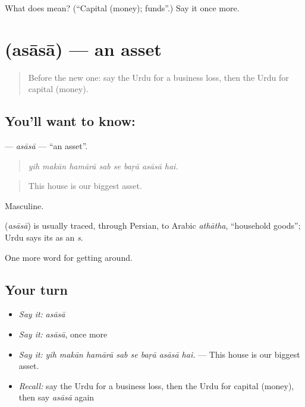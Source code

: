 \begin{tcolorbox}[breakable,colback=teal!4,colframe=teal!35!black,title={Before you move on}]
What does  mean? (\textquotedblleft{}Capital (money); funds\textquotedblright{}.) Say it once more.
\end{tcolorbox}
\section[\texorpdfstring{\ur{اثاثہ} (asāsā)}{اثاثہ (asāsā)}]{ (asāsā) — an asset}

\label{lesson:UR-C419-asasa}



\begin{quote}
Before the new one: say the Urdu for a business loss, then the Urdu for capital (money).
\end{quote}

\subsection*{You'll want to know: }
\textbf{} — \emph{asāsā} — \textquotedblleft{}an asset\textquotedblright{}.

\begin{quote}
       
\end{quote}

\begin{quote}
\emph{yih makān hamārā sab se baṛā asāsā hai.}
\end{quote}

\begin{quote}
This house is our biggest asset.
\end{quote}

Masculine.

\begin{cousinweb}
\textbf{} (\emph{asāsā}) is usually traced, through Persian, to Arabic \emph{athātha}, \textquotedblleft{}household goods\textquotedblright{}; Urdu says its \textbf{} as an \emph{s}.
\end{cousinweb}

\begin{grammarlens}[title={What you've built}]
One more word for getting around.
\end{grammarlens}

\subsection*{Your turn}
\begin{itemize}
\raggedright
  \item \emph{Say it:} \emph{asāsā}
  \item \emph{Say it:} \emph{asāsā}, once more
  \item \emph{Say it:} \emph{yih makān hamārā sab se baṛā asāsā hai.} — This house is our biggest asset.
  \item \emph{Recall:} say the Urdu for a business loss, then the Urdu for capital (money), then say \emph{asāsā} again
\end{itemize}

